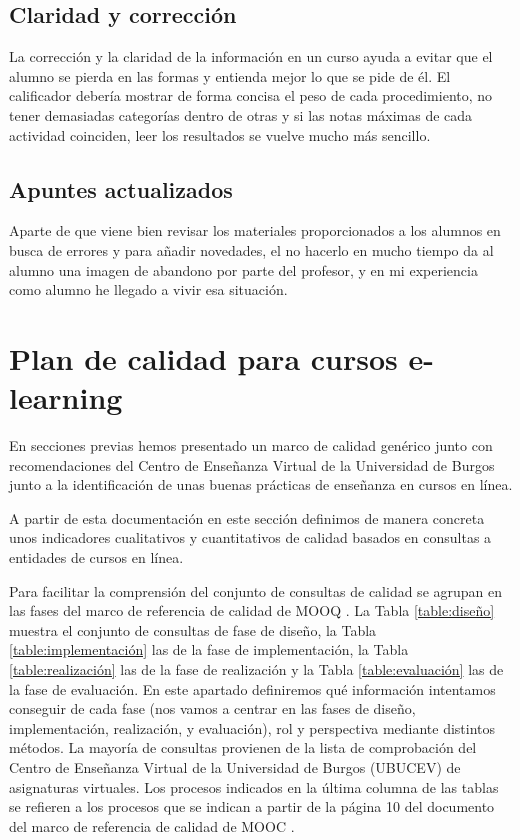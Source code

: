 \subsection{Claridad y corrección}
La corrección y la claridad de la información en un curso ayuda a evitar que el alumno se pierda en las formas y entienda mejor lo que se pide de él.
El calificador debería mostrar de forma concisa el peso de cada procedimiento, no tener demasiadas categorías dentro de otras y si las notas máximas de cada actividad coinciden, leer los resultados se vuelve mucho más sencillo.

\subsection{Apuntes actualizados}
Aparte de que viene bien revisar los materiales proporcionados a los alumnos en busca de errores y para añadir novedades, el no hacerlo en mucho tiempo da al alumno una imagen de abandono por parte del profesor, y en mi experiencia como alumno he llegado a vivir esa situación.

\section{Plan de calidad para cursos e-learning}
En secciones previas hemos presentado un marco de calidad genérico junto con recomendaciones del Centro de Enseñanza Virtual de la Universidad de Burgos junto a la identificación de unas buenas prácticas de enseñanza en cursos en línea.

A partir de esta documentación en este sección definimos de manera concreta unos indicadores cualitativos y cuantitativos de calidad basados en consultas a entidades de cursos en línea.

Para facilitar la comprensión del conjunto de consultas de calidad se agrupan en las fases del marco de referencia de calidad de MOOQ \cite{stracke2018quality}. La Tabla \ref{table:diseño} muestra el  conjunto  de consultas de  fase de diseño, la Tabla \ref{table:implementación} las de la fase de implementación, la Tabla \ref{table:realización} las de la fase de realización y la Tabla \ref{table:evaluación} las de la fase de evaluación.
En este apartado definiremos qué información intentamos conseguir de cada fase (nos vamos a centrar en las fases de diseño, implementación, realización, y evaluación), rol y perspectiva mediante distintos métodos. La mayoría de consultas provienen de la lista de comprobación del Centro de Enseñanza Virtual de la Universidad de Burgos (UBUCEV) de asignaturas virtuales.
Los procesos indicados en la última columna de las tablas se refieren a los procesos que se indican a partir de la página 10 del documento del marco de referencia de calidad de MOOC \cite{stracke2018quality}.

